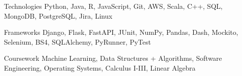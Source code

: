 
\begin{cvskills}
  \cvskill
    {Technologies} %
    {Python, Java, R, JavaScript, Git, AWS, Scala, C++, SQL, MongoDB, PostgreSQL, Jira, Linux} %

  \cvskill
    {Frameworks } %
    {Django, Flask, FastAPI, JUnit, NumPy, Pandas, Dash, Mockito, Selenium, BS4, SQLAlchemy, PyRunner, PyTest} %

\cvskill
    {Coursework } %
    {Machine Learning, Data Structures + Algorithms, Software Engineering, Operating Systems, Calculus I-III, Linear Algebra} %
\end{cvskills}

